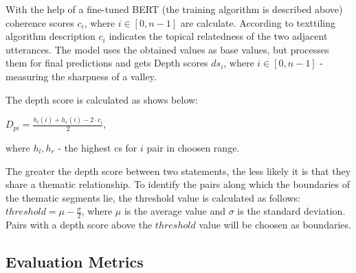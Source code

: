 \documentclass[PMI,VKR]{HSEUniversity}
\begin{document}
With the help of a fine-tuned BERT (the training algorithm is described above) coherence scores $c_i$, where $i \in [0, n - 1]$ are calculate. According to texttiling algorithm description $c_i$ indicates the topical relatedness of the two adjacent utterances.
The model uses the obtained values as base values, but processes them for final predictions and gets Depth scores $ds_i$, where $i \in [0, n - 1]$  - measuring the sharpness of a valley.

The depth score is calculated as shows below: 
\begin{center}
    $D_{pi} = \frac{h_{l}(i) + h_{r}(i) - 2 \cdot c_{i}}{2}$,
\end{center}
where $h_{l}, h_{r}$ - the highest cs for $i$ pair in choosen range.

The greater the depth score between two statements, the less likely it is that they share a thematic relationship. 
To identify the pairs along which the boundaries of the thematic segments lie, the threshold value is calculated as follows: $threshold = \mu - \frac{\sigma}{2}$, where $\mu$ is the average value and $\sigma$ is the standard deviation. Pairs with a depth score above the $threshold$ value will be choosen as boundaries.

\subsection{Evaluation Metrics}
\end{document}
